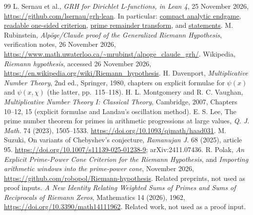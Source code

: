 \documentclass[11pt]{article}
\theoremstyle{remark}\newtheorem{remark}[theorem]{Remark}
\begin{document}
\begin{thebibliography}{99}
 L. Sernau et al., \emph{GRH for Dirichlet L-functions, in Lean 4}, 25 November 2026, \url{https://github.com/lsernau/grh-lean}. In particular: \href{https://github.com/lsernau/grh-lean/blob/main/grh-compact/src/New/Main.lean}{compact analytic endgame}, \href{https://github.com/lsernau/grh-lean/blob/main/grh/src/New/Reduction/Zeros/Criterion.lean}{readable one-sided criterion}, \href{https://github.com/lsernau/grh-lean/blob/main/grh/src/New/Reduction/Zeros/PrimeError.lean}{prime remainder transform}, and \href{https://github.com/lsernau/grh-lean/blob/main/grh-compact/src/Statements.lean}{statements}.
 M. Rubinstein, \emph{Alp\"oge/Claude proof of the Generalized Riemann Hypothesis}, verification notes, 26 November 2026, \url{https://www.math.uwaterloo.ca/~mrubinst/alpoge_claude_grh/}.
 Wikipedia, \emph{Riemann hypothesis}, accessed 26 November 2026, \url{https://en.wikipedia.org/wiki/Riemann_hypothesis}.
 H. Davenport, \emph{Multiplicative Number Theory}, 2nd ed., Springer, 1980, chapters on explicit formulae for $\psi(x)$ and $\psi(x,\chi)$ (the latter, pp.~115--118).
 H. L. Montgomery and R. C. Vaughan, \emph{Multiplicative Number Theory I: Classical Theory}, Cambridge, 2007, Chapters 10--12, 15 (explicit formulae and Landau's oscillation method).
 E. S. Lee, The prime number theorem for primes in arithmetic progressions at large values, \emph{Q. J. Math.} 74 (2023), 1505--1533. \url{https://doi.org/10.1093/qjmath/haad031}.
 M. Suzuki, On variants of Chebyshev's conjecture, \emph{Ramanujan J.} 68 (2025), article 95. \url{https://doi.org/10.1007/s11139-025-01238-9}; arXiv:2411.07436.
 R. Polak, \emph{An Explicit Prime-Power Cone Criterion for the Riemann Hypothesis}, and \emph{Importing arithmetic windows into the prime-power cone}, November 2026, \url{https://github.com/robopol/Riemann-hypothesis}. Related preprints, not used as proof inputs.
 \emph{A New Identity Relating Weighted Sums of Primes and Sums of Reciprocals of Riemann Zeros}, Mathematics 14 (2026), 1962, \url{https://doi.org/10.3390/math14111962}. Related work, not used as a proof input.
\end{thebibliography}
\end{document}
